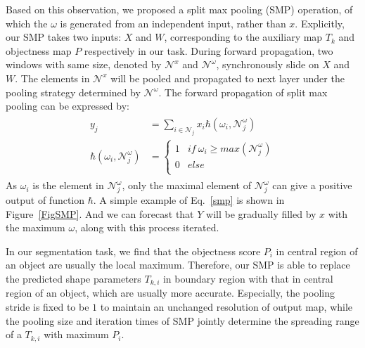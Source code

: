 Based on this observation, we proposed a split max pooling (SMP) operation, of which the $\omega$ is generated from an independent input, rather than $x$.
Explicitly, our SMP takes two inputs: $X$ and $W$, corresponding to the auxiliary map $T_k$ and objectness map $P$ respectively in our task.
During forward propagation, two windows with same size, denoted by $\mathcal{N}^{x}$ and $\mathcal{N}^{\omega}$, synchronously slide on $X$ and $W$.
The elements in $\mathcal{N}^{x}$ will be pooled and propagated to next layer under the pooling strategy determined by $\mathcal{N}^{\omega}$.
The forward propagation of split max pooling can be expressed by:
\begin{eqnarray}\label{smp}
\begin{aligned}
y_{j} &= \sum_{i\in \mathcal{N}_{j}}x_{i}\hbar(\omega_{i},\mathcal{N}^{\omega}_{j})\\
\hbar(\omega_{i},\mathcal{N}^{\omega}_{j})&=\left\{\begin{array}{cc}
1&if~\omega_{i}\geq max(\mathcal{N}^{\omega}_{j})\\
0&else\\
\end{array}\right.
\end{aligned}
\end{eqnarray}
As $\omega_i$ is the element in $\mathcal{N}^{\omega}_{j}$, only the maximal element of $\mathcal{N}^{\omega}_{j}$ can give a positive output of function $\hbar$.
A simple example of Eq.~\ref{smp} is shown in Figure~\ref{FigSMP}.
And we can forecast that $Y$ will be gradually filled by $x$ with the maximum $\omega$, along with this process iterated.

In our segmentation task, we find that the objectness score $P_i$ in central region of an object are usually the local maximum.
Therefore, our SMP is able to replace the predicted shape parameters $T_{k,i}$ in boundary region with that in central region of an object, which are usually more accurate.
Especially, the pooling stride is fixed to be $1$ to maintain an unchanged resolution of output map, while the pooling size and iteration times of SMP jointly determine the spreading range of a $T_{k,i}$ with maximum $P_i$.

